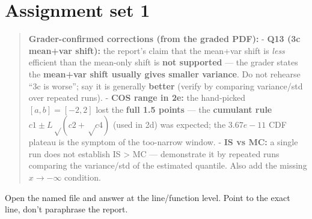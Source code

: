 \documentclass[
  11pt,
]{article}
\begin{document}
\hypertarget{assignment-set-1}{%
\section{Assignment set 1}\label{assignment-set-1}}

\begin{quote}
\textbf{Grader-confirmed corrections (from the graded PDF):} -
\textbf{Q13 (3c mean+var shift):} the report's claim that the mean+var
shift is \emph{less} efficient than the mean-only shift is \textbf{not
supported} --- the grader states the \textbf{mean+var shift usually
gives smaller variance}. Do not rehearse ``3c is worse''; say it is
generally \textbf{better} (verify by comparing variance/std over
repeated runs). - \textbf{COS range in 2e:} the hand-picked
\([a,b]=[−2,2]\) lost the \textbf{full 1.5 points} --- the
\textbf{cumulant rule} \(c1 ± L√(c2+√c4)\) (used in 2d) was expected;
the \(3.67e-11\) CDF plateau is the symptom of the too-narrow window. -
\textbf{IS vs MC:} a single run does not establish IS \textgreater{} MC
--- demonstrate it by repeated runs comparing the variance/std of the
estimated quantile. Also add the missing \(x → −∞\) condition.
\end{quote}

Open the named file and answer at the line/function level. Point to the
exact line, don't paraphrase the report.
\end{document}
